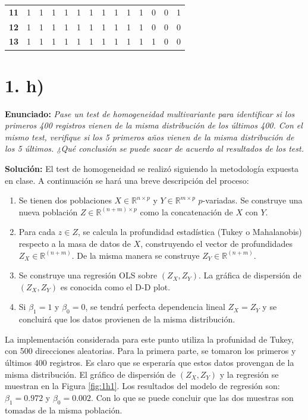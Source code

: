 \documentclass[fleqn]{article}
\begin{document}
\begin{table}[H]
\begin{tabular}{c|ccccccccccccc}
\textbf{11} & 1          & 1          & 1          & 1          & 1          & 1          & 1          & 1          & 1          & 1           & 0           & 0           & 1           \\
\textbf{12} & 1          & 1          & 1          & 1          & 1          & 1          & 1          & 1          & 1          & 1           & 0           & 0           & 0           \\
\textbf{13} & 1          & 1          & 1          & 1          & 1          & 1          & 1          & 1          & 1          & 1           & 1           & 0           & 0          
\end{tabular}
\end{table}


\section*{1. h)}
\textbf{Enunciado:} \textit{Pase un test de homogeneidad multivariante para identificar si los primeros 400 registros vienen de la misma distribución de los últimos 400. Con el mismo test, verifique si los 5 primeros años vienen de la misma distribución de los 5 últimos. ¿Qué conclusión se puede sacar de acuerdo al resultados de los test.}

\textbf{Solución:} El test de homogeneidad se realizó siguiendo la metodología expuesta en clase. A continuación se hará una breve descripción del proceso:
\begin{enumerate}
    \item Se tienen dos poblaciones $X\in\mathbb{R}^{n\times p}$ y $Y\in\mathbb{R}^{m\times p}$ $p$-variadas. Se construye una nueva población $Z\in\mathbb{R}^{(n+m)\times p}$ como la concatenación de $X$ con $Y$.
    \item Para cada $z\in Z$, se calcula la profundidad estadística (Tukey o Mahalanobis) respecto a la masa de datos de $X$, construyendo el vector de profundidades $Z_X\in\mathbb{R}^{(n+m)}$. De la misma manera se construye $Z_Y\in\mathbb{R}^{(n+m)}$.
    \item Se construye una regresión OLS sobre $(Z_X,Z_Y)$. La gráfica de dispersión de $(Z_X,Z_Y)$ es conocida como el D-D plot.
    \item Si $\beta_1=1$ y $\beta_0=0$, se tendrá perfecta dependencia lineal $Z_X=Z_Y$ y se concluirá que los datos provienen de la misma distribución.
\end{enumerate}
La implementación considerada para este punto utiliza la profunidad de Tukey, con 500 direcciones aleatorias. Para la primera parte, se tomaron los primeros y últimos 400 registros. Es claro que se esperaría que estos datos provengan de la misma distribución. El gráfico de dispersión de $(Z_X,Z_Y)$ y la regresión se muestran en la Figura \ref{fig:1h1}. Los resultados del modelo de regresión son: $\beta_1=0.972$ y $\beta_0=0.002$. Con lo que se puede concluir que las dos muestras son tomadas de la misma población.
\end{document}
